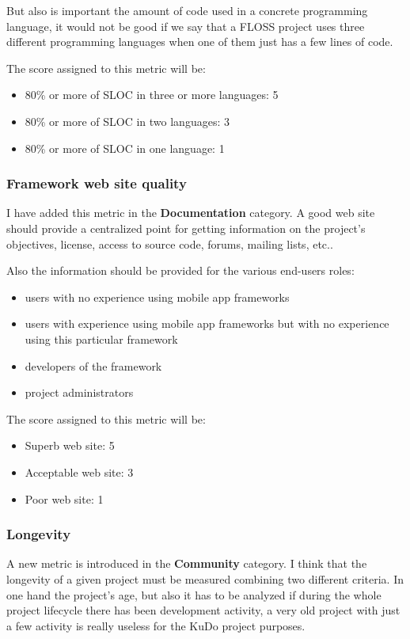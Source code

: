 \documentclass[a4paper,12pt]{book}
\begin{document}
But also is important the amount of code used in a concrete programming language, it would not be good if we say that a FLOSS project uses three different programming languages when one of them just has a few lines of code.

The score assigned to this metric will be:
\begin{itemize}
 \item 80\% or more of SLOC in three or more languages: 5
 \item 80\% or more of SLOC in two languages: 3
 \item 80\% or more of SLOC in one language: 1
\end{itemize}

\subsubsection{Framework web site quality}
\label{Framework web site quality}

I have added this metric in the \textbf{Documentation} category. A good web site should provide a centralized point for getting information on the project's objectives, license, access to source code, forums, mailing lists, etc..

Also the information should be provided for the various end-users roles: 
\begin{itemize}
 \item users with no experience using mobile app frameworks
 \item users with experience using mobile app frameworks but with no experience using this particular framework
 \item developers of the framework
 \item project administrators
\end{itemize}

The score assigned to this metric will be:
\begin{itemize}
 \item Superb web site: 5
 \item Acceptable web site: 3
 \item Poor web site: 1
\end{itemize}

\subsubsection{Longevity}
\label{Longevity}
A new metric is introduced in the \textbf{Community} category. I think that the longevity of a given project must be measured combining two different criteria. In one hand the project's age, but also it has to be analyzed if during the whole project lifecycle there has been development activity, a very old project with just a few activity is really useless for the KuDo project purposes.
\end{document}
